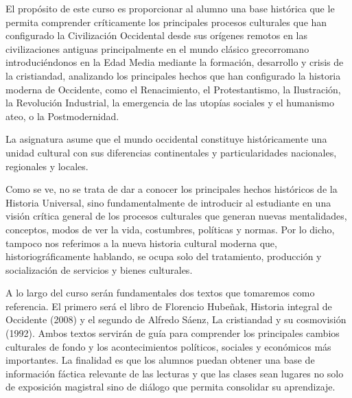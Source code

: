 \begin{syllabus}


\begin{justification}
El propósito de este curso es proporcionar al alumno una base histórica 
que le permita comprender críticamente los principales procesos culturales 
que han configurado la Civilización Occidental desde sus orígenes remotos en 
las civilizaciones antiguas principalmente en el mundo clásico grecorromano 
introduciéndonos en la Edad Media mediante la formación, desarrollo y crisis 
de la cristiandad, analizando los principales hechos que han configurado la 
historia moderna de Occidente, como el Renacimiento, el Protestantismo, 
la Ilustración, la Revolución Industrial, la emergencia de las utopías sociales 
y el humanismo ateo, o la Postmodernidad.

La asignatura asume que el mundo occidental constituye históricamente una 
unidad cultural con sus diferencias continentales y particularidades nacionales, 
regionales y locales.

Como se ve, no se trata de dar a conocer los principales hechos históricos de la 
Historia Universal, sino fundamentalmente de introducir al estudiante en una 
visión crítica general de los procesos culturales que generan nuevas mentalidades, 
conceptos, modos de ver la vida, costumbres, políticas y normas. 
Por lo dicho, tampoco nos referimos a la nueva historia cultural moderna que, 
historiográficamente hablando, se ocupa solo del tratamiento, producción y 
socialización de servicios y bienes culturales.

A lo largo del curso serán fundamentales dos textos que tomaremos como referencia. 
El primero será el libro de Florencio Hubeñak, Historia integral de Occidente (2008) 
y el segundo de Alfredo Sáenz, La cristiandad y su cosmovisión (1992). 
Ambos textos servirán de guía para comprender los principales cambios culturales 
de fondo y los acontecimientos políticos, sociales y económicos más importantes.
La finalidad es que los alumnos puedan obtener una base de información fáctica 
relevante de las lecturas y que las clases sean lugares no solo de exposición 
magistral sino de diálogo que permita consolidar su aprendizaje.


\end{justification}
\end{syllabus}
